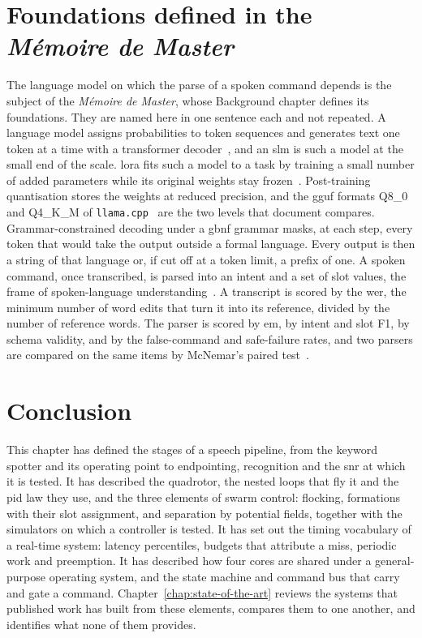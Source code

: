 \section{Foundations defined in the \emph{M\'emoire de Master}}
\label{sec:bg-master}
The language model on which the parse of a spoken command depends is the subject of the
\emph{M\'emoire de Master}, whose Background chapter defines its foundations. They are named here in
one sentence each and not repeated. A language model assigns probabilities to token sequences and
generates text one token at a time with a transformer decoder~\cite{vaswani2017}, and an \gls{slm} is
such a model at the small end of the scale. \Gls{lora} fits such a model to a task by training a
small number of added parameters while its original weights stay frozen~\cite{lora}. Post-training
quantisation stores the weights at reduced precision, and the \gls{gguf} formats Q8\_0 and Q4\_K\_M
of \texttt{llama.cpp}~\cite{llamacpp} are the two levels that document compares. Grammar-constrained
decoding under a \gls{gbnf} grammar masks, at each step, every token that would take the output
outside a formal language. Every output is then a string of that language or, if cut off at a token
limit, a prefix of one. A spoken command, once transcribed, is parsed into an intent and a set of
slot values, the frame of spoken-language understanding~\cite{qin2021}. A transcript is scored by
the \gls{wer}, the minimum number of word edits that turn it into its reference, divided by the
number of reference words. The parser is scored by \gls{em}, by intent and slot F1, by schema
validity, and by the false-command and safe-failure rates, and two parsers are compared on the same
items by McNemar's paired test~\cite{mcnemar1947}.

\section{Conclusion}
\label{sec:bg-conclusion}
This chapter has defined the stages of a speech pipeline, from the keyword spotter and its
operating point to endpointing, recognition and the \gls{snr} at which it is tested. It has
described the quadrotor, the nested loops that fly it and the \gls{pid} law they use, and the
three elements of swarm control: flocking, formations with their slot assignment, and separation
by potential fields, together with the simulators on which a controller is tested. It has set out
the timing vocabulary of a real-time system: latency percentiles, budgets that attribute a miss,
periodic work and preemption. It has described how four cores are shared under a general-purpose
operating system, and the state machine and command bus that carry and gate a command.
Chapter~\ref{chap:state-of-the-art} reviews the systems that published work has built from these
elements, compares them to one another, and identifies what none of them provides.

